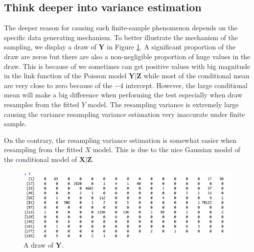 \documentclass{article}
\begin{document}
\subsection{Think deeper into variance estimation}

The deeper reason for causing such finite-sample phenomenon depends on the specific data generating mechanism.
To better illustrate the mechanism of the sampling, we display a draw of $\bm Y$ in Figure \ref{fig:draw_data}.
A significant proportion of the draw are zeros but there are also a non-negligible proportion of huge values in the draw.
This is because of we sometimes can get positive values with big magnitude in the link function of the Poisson model 
$\bm Y|\bm Z$ while most of the conditional mean are very close to zero because of the $-4$ intercept. However, the 
large conditional mean will make a big difference when performing the test especially when draw resamples 
from the fitted $Y$ model. The resampling variance is extremely large causing the variance resampling variance estimation 
very inaccurate under finite sample. 

On the contrary, the resampling variance estimation is somewhat easier when resampling from the fitted $X$ model. This is 
due to the nice Gaussian model of the conditional model of $\bm X|\bm Z$.

\begin{figure}[!h]
    \centering
    \includegraphics[scale = 0.35]{Figures/Q2/draw_data.png}
    \caption{A draw of $\bm Y$.}
    \label{fig:draw_data}
\end{figure}


\newpage
{\scriptsize
\printbibliography
}

\newpage



\end{document}
